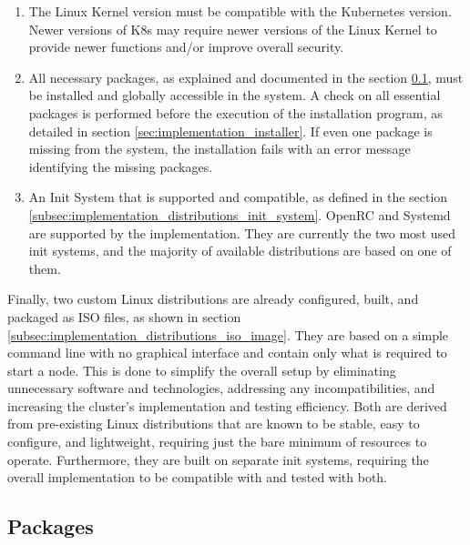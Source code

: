 \begin{enumerate}
  \item The Linux Kernel version must be compatible with the Kubernetes version.
    \newline
    Newer versions of K8s may require newer versions of the Linux Kernel to
    provide newer functions and/or improve overall security.

  \item All necessary packages, as explained and documented in the section
    \ref{subsec:implementation_distributions_packages}, must be installed and globally
    accessible in the system.
    \newline
    A check on all essential packages is performed before the execution of the
    installation program, as detailed in section \ref{sec:implementation_installer}.
    If even one package is missing from the system, the installation fails with an
    error message identifying the missing packages.

  \item An Init System that is supported and compatible, as defined in the
    section \ref{subsec:implementation_distributions_init_system}.
    \newline
    OpenRC and Systemd are supported by the implementation. They are currently
    the two most used init systems, and the majority of available distributions are
    based on one of them.
\end{enumerate}
Finally, two custom Linux distributions are already configured, built, and packaged
as ISO files, as shown in section
\ref{subsec:implementation_distributions_iso_image}. They are based on a simple command
line with no graphical interface and contain only what is required to start a node.
This is done to simplify the overall setup by eliminating unnecessary software
and technologies, addressing any incompatibilities, and increasing the cluster's
implementation and testing efficiency. Both are derived from pre-existing Linux distributions
that are known to be stable, easy to configure, and lightweight, requiring just
the bare minimum of resources to operate. Furthermore, they are built on
separate init systems, requiring the overall implementation to be compatible with
and tested with both.

\subsection{Packages}
\label{subsec:implementation_distributions_packages}

